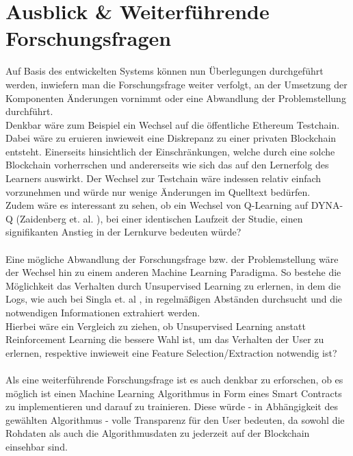 \section{Ausblick \& Weiterf\"uhrende Forschungsfragen}
\label{sec:weiterforschen}
Auf Basis des entwickelten Systems können nun Überlegungen durchgeführt werden, inwiefern man die Forschungsfrage weiter verfolgt, an der Umsetzung der Komponenten Änderungen vornimmt oder eine Abwandlung der Problemstellung durchführt. \\
Denkbar wäre zum Beispiel ein Wechsel auf die öffentliche Ethereum Testchain. Dabei wäre zu eruieren inwieweit eine Diskrepanz zu einer privaten Blockchain entsteht. Einerseits hinsichtlich der Einschränkungen, welche durch eine solche  Blockchain vorherrschen und andererseits wie sich das auf den Lernerfolg des Learners auswirkt. Der Wechsel zur Testchain wäre indessen relativ einfach vorzunehmen und würde nur wenige Änderungen im Quelltext bedürfen. \\ 
Zudem wäre es interessant zu sehen, ob ein Wechsel von Q-Learning auf DYNA-Q (Zaidenberg et. al. \cite{zaidenberg:hal-00788028}), bei einer identischen Laufzeit der Studie, einen signifikanten Anstieg in der Lernkurve bedeuten würde?\\\\
Eine mögliche Abwandlung der Forschungsfrage bzw. der Problemstellung wäre der Wechsel hin zu einem anderen Machine Learning Paradigma. So bestehe die Möglichkeit das Verhalten durch Unsupervised Learning zu erlernen, in dem die Logs, wie auch bei Singla et. al \cite{Singla:MLSDPUB}, in regelmäßigen Abständen durchsucht und die notwendigen Informationen extrahiert werden. \\
Hierbei wäre ein Vergleich zu ziehen, ob Unsupervised Learning anstatt Reinforcement Learning die bessere Wahl ist, um das Verhalten der User zu erlernen, respektive inwieweit eine Feature Selection/Extraction notwendig ist?\\\\
Als eine weiterführende Forschungsfrage ist es auch denkbar zu erforschen, ob es möglich ist einen Machine Learning Algorithmus in Form eines Smart Contracts zu implementieren und darauf zu trainieren. Diese  würde - in Abhängigkeit des gewählten Algorithmus - volle Transparenz für den User bedeuten, da sowohl die Rohdaten als auch die Algorithmusdaten zu jederzeit auf der Blockchain einsehbar sind.